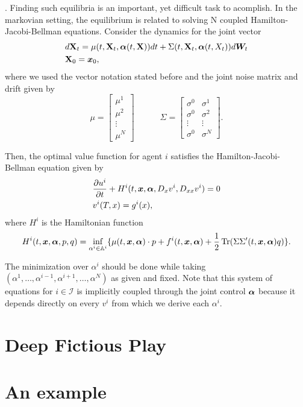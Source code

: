 . Finding such equilibria is an important, yet difficult task to acomplish. In the markovian setting, the equilibrium is related to solving N coupled Hamilton-Jacobi-Bellman equations. Consider the dynamics for the joint vector 
\begin{equation}
	\begin{split}
&d\mathbf{X}_t=\mu(t,\mathbf{X}_t,\bm{\alpha}(t,\mathbf{X}))dt+\Sigma(t,\mathbf{X}_t,\bm{\alpha}(t,X_t))d\bm{W}_t\\
&\mathbf{X}_0=\bm{x}_0,
	\end{split}
\end{equation}
where we used the vector notation stated before and the joint noise matrix and drift given by
\begin{equation}
	\mu=\begin{bmatrix}
		\mu^1 \\
		\mu^2 \\
		\vdots   \\
		\mu^N
	\end{bmatrix}
	\quad\quad\quad
	\Sigma=\begin{bmatrix}
		\sigma^0 & \sigma^1\\
		\sigma^0 & \sigma^2\\
		\vdots   &  \vdots\\
		\sigma^0 & \sigma^N
	\end{bmatrix}.
\end{equation}

Then, the optimal value function for agent $i$ satisfies the Hamilton-Jacobi-Bellman equation given by
\begin{equation}
	\begin{split}
	&\frac{\partial u^i}{\partial t}+H^i(t,\bm{x},\bm{\alpha},D_x v^i,D_{xx} v^i)=0\\
	&v^i(T,x)=g^i(x),
	\end{split}
\end{equation}
where $H^i$ is the Hamiltonian function 
\begin{equation}
	H^i(t,\bm{x},\bm{\alpha},p,q)=\inf_{\alpha^i\in \mathbb{A}^i}\{\mu(t,\bm{x},\bm{\alpha})\cdot p+f^i(t,\bm{x},\bm{\alpha})+\frac{1}{2}\operatorname{Tr}(\Sigma\Sigma'(t,\bm{x},\bm{\alpha}) q)\}.
\end{equation}

The minimization over $\alpha^i$ should be done while taking $(\alpha^1,\ldots,\alpha^{i-1},\alpha^{i+1},\ldots,\alpha^N)$ as given and fixed. Note that this system of equations for $i\in\mathcal{I}$ is implicitly coupled through the joint control $\bm{\alpha}$ because it depends directly on every $v^i$ from which we derive each $\alpha^i$.

\section{Deep Fictious Play}
\section{An example}